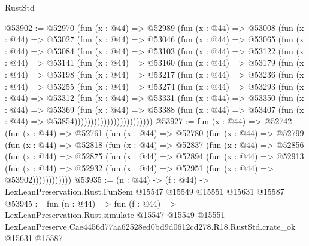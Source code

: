 \begin{lexlean}{RustStd}
\begin{coremodule}
@53902 := @52970
    (fun (x : @44) =>
    @52989
      (fun (x : @44) =>
      @53008
        (fun (x : @44) =>
        @53027
          (fun (x : @44) =>
          @53046
            (fun (x : @44) =>
            @53065
              (fun (x : @44) =>
              @53084
                (fun (x : @44) =>
                @53103
                  (fun (x : @44) =>
                  @53122
                    (fun (x : @44) =>
                    @53141
                      (fun (x : @44) =>
                      @53160
                        (fun (x : @44) =>
                        @53179
                          (fun (x : @44) =>
                          @53198
                            (fun (x : @44) =>
                            @53217
                              (fun (x : @44) =>
                              @53236
                                (fun (x : @44) =>
                                @53255
                                  (fun (x : @44) =>
                                  @53274
                                    (fun (x : @44) =>
                                    @53293
                                      (fun (x : @44) =>
                                      @53312
                                        (fun (x : @44) =>
                                        @53331
                                          (fun (x : @44) =>
                                          @53350
                                            (fun (x : @44) =>
                                            @53369
                                              (fun (x : @44) =>
                                              @53388
                                                (fun (x : @44) =>
                                                @53407
                                                  (fun (x : @44) => @53854))))))))))))))))))))))))
@53927 := fun (x : @44) =>
  @52742
    (fun (x : @44) =>
    @52761
      (fun (x : @44) =>
      @52780
        (fun (x : @44) =>
        @52799
          (fun (x : @44) =>
          @52818
            (fun (x : @44) =>
            @52837
              (fun (x : @44) =>
              @52856
                (fun (x : @44) =>
                @52875
                  (fun (x : @44) =>
                  @52894
                    (fun (x : @44) =>
                    @52913
                      (fun (x : @44) =>
                      @52932 (fun (x : @44) => @52951 (fun (x : @44) => @53902))))))))))))
@53935 := (n : @44) ->
  (f : @44) -> LexLeanPreservation.Rust.FunSem @15547 @15549 @15551 @15631 @15587
@53945 := fun (n : @44) =>
  fun (f : @44) =>
  LexLeanPreservation.Rust.simulate
    @15547
    @15549
    @15551
    LexLeanPreserve.Cae4456d77aa62528ed0bd9d0612cd278.R18.RustStd.crate_ok
    @15631
    @15587
\end{coremodule}
\end{lexlean}
